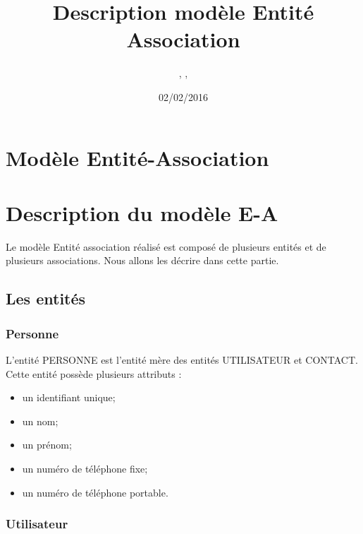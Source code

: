 \documentclass[asi, sansVersion]{picINSA}
\begin{document}
\title{Description modèle Entité Association}
\author{\Florian, \Mathieu, \Julie}
\date{02/02/2016} 

\maketitle

\tableofcontents

\chapter{Modèle Entité-Association}


\chapter{Description du modèle E-A}

Le modèle Entité association réalisé est composé de plusieurs entités et de plusieurs associations. Nous allons les décrire dans cette partie. \\ 

\section{Les entités}

\subsection*{Personne}

L'entité PERSONNE est l'entité mère des entités UTILISATEUR et CONTACT. \\
Cette entité possède plusieurs attributs : 
\begin{itemize}
\item un identifiant unique;
\item un nom; %
\item un prénom; %
\item un numéro de téléphone fixe; %
\item un numéro de téléphone portable. %
\end{itemize}

\subsection*{Utilisateur}
\end{document}
